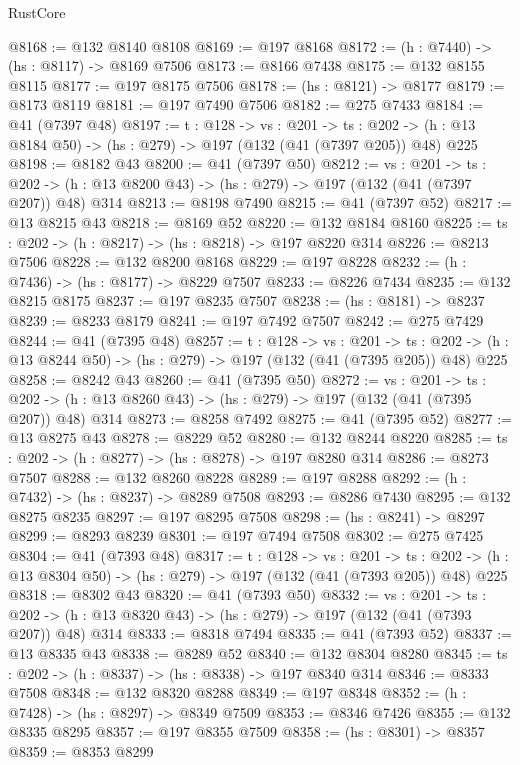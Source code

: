 \begin{lexlean}{RustCore}
\begin{coremodule}
@8168 := @132 @8140 @8108
@8169 := @197 @8168
@8172 := (h : @7440) -> (hs : @8117) -> @8169 @7506
@8173 := @8166 @7438
@8175 := @132 @8155 @8115
@8177 := @197 @8175 @7506
@8178 := (hs : @8121) -> @8177
@8179 := @8173 @8119
@8181 := @197 @7490 @7506
@8182 := @275 @7433
@8184 := @41 (@7397 @48)
@8197 := {t : @128} ->
  {vs : @201} ->
  {ts : @202} -> (h : @13 @8184 @50) -> (hs : @279) -> @197 (@132 (@41 (@7397 @205)) @48) @225
@8198 := @8182 @43
@8200 := @41 (@7397 @50)
@8212 := {vs : @201} ->
  {ts : @202} -> (h : @13 @8200 @43) -> (hs : @279) -> @197 (@132 (@41 (@7397 @207)) @48) @314
@8213 := @8198 @7490
@8215 := @41 (@7397 @52)
@8217 := @13 @8215 @43
@8218 := @8169 @52
@8220 := @132 @8184 @8160
@8225 := {ts : @202} -> (h : @8217) -> (hs : @8218) -> @197 @8220 @314
@8226 := @8213 @7506
@8228 := @132 @8200 @8168
@8229 := @197 @8228
@8232 := (h : @7436) -> (hs : @8177) -> @8229 @7507
@8233 := @8226 @7434
@8235 := @132 @8215 @8175
@8237 := @197 @8235 @7507
@8238 := (hs : @8181) -> @8237
@8239 := @8233 @8179
@8241 := @197 @7492 @7507
@8242 := @275 @7429
@8244 := @41 (@7395 @48)
@8257 := {t : @128} ->
  {vs : @201} ->
  {ts : @202} -> (h : @13 @8244 @50) -> (hs : @279) -> @197 (@132 (@41 (@7395 @205)) @48) @225
@8258 := @8242 @43
@8260 := @41 (@7395 @50)
@8272 := {vs : @201} ->
  {ts : @202} -> (h : @13 @8260 @43) -> (hs : @279) -> @197 (@132 (@41 (@7395 @207)) @48) @314
@8273 := @8258 @7492
@8275 := @41 (@7395 @52)
@8277 := @13 @8275 @43
@8278 := @8229 @52
@8280 := @132 @8244 @8220
@8285 := {ts : @202} -> (h : @8277) -> (hs : @8278) -> @197 @8280 @314
@8286 := @8273 @7507
@8288 := @132 @8260 @8228
@8289 := @197 @8288
@8292 := (h : @7432) -> (hs : @8237) -> @8289 @7508
@8293 := @8286 @7430
@8295 := @132 @8275 @8235
@8297 := @197 @8295 @7508
@8298 := (hs : @8241) -> @8297
@8299 := @8293 @8239
@8301 := @197 @7494 @7508
@8302 := @275 @7425
@8304 := @41 (@7393 @48)
@8317 := {t : @128} ->
  {vs : @201} ->
  {ts : @202} -> (h : @13 @8304 @50) -> (hs : @279) -> @197 (@132 (@41 (@7393 @205)) @48) @225
@8318 := @8302 @43
@8320 := @41 (@7393 @50)
@8332 := {vs : @201} ->
  {ts : @202} -> (h : @13 @8320 @43) -> (hs : @279) -> @197 (@132 (@41 (@7393 @207)) @48) @314
@8333 := @8318 @7494
@8335 := @41 (@7393 @52)
@8337 := @13 @8335 @43
@8338 := @8289 @52
@8340 := @132 @8304 @8280
@8345 := {ts : @202} -> (h : @8337) -> (hs : @8338) -> @197 @8340 @314
@8346 := @8333 @7508
@8348 := @132 @8320 @8288
@8349 := @197 @8348
@8352 := (h : @7428) -> (hs : @8297) -> @8349 @7509
@8353 := @8346 @7426
@8355 := @132 @8335 @8295
@8357 := @197 @8355 @7509
@8358 := (hs : @8301) -> @8357
@8359 := @8353 @8299

\end{coremodule}
\end{lexlean}
